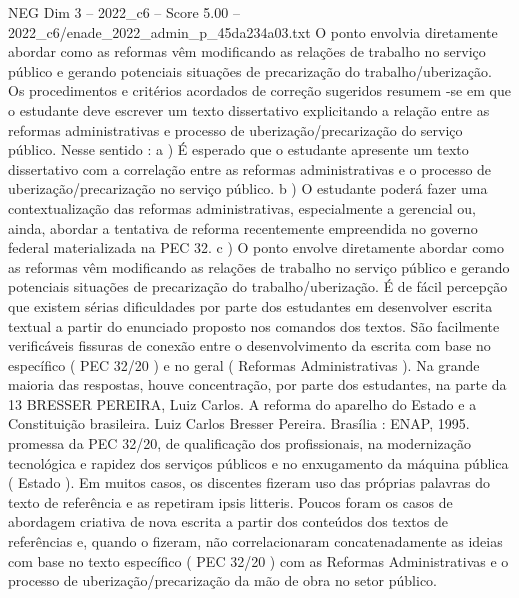 \begin{textsample}{NEG Dim 3 – 2022\_c6 – Score 5.00 – 2022\_c6/enade\_2022\_admin\_p\_45da234a03.txt}
O ponto envolvia diretamente abordar como as reformas vêm modificando as relações de trabalho no serviço público e gerando potenciais situações de precarização do trabalho/uberização.
Os procedimentos e critérios acordados de correção sugeridos resumem -se em que o estudante deve escrever um texto dissertativo explicitando a relação entre as reformas administrativas e processo de uberização/precarização do serviço público.
Nesse sentido : a ) É esperado que o estudante apresente um texto dissertativo com a correlação entre as reformas administrativas e o processo de uberização/precarização no serviço público. b ) O estudante poderá fazer uma contextualização das reformas administrativas, especialmente a gerencial ou, ainda, abordar a tentativa de reforma recentemente empreendida no governo federal materializada na PEC 32. c ) O ponto envolve diretamente abordar como as reformas vêm modificando as relações de trabalho no serviço público e gerando potenciais situações de precarização do trabalho/uberização.
É de fácil percepção que existem sérias dificuldades por parte dos estudantes em desenvolver escrita textual a partir do enunciado proposto nos comandos dos textos.
São facilmente verificáveis fissuras de conexão entre o desenvolvimento da escrita com base no específico ( PEC 32/20 ) e no geral ( Reformas Administrativas ).
Na grande maioria das respostas, houve concentração, por parte dos estudantes, na parte da 13 BRESSER PEREIRA, Luiz Carlos.
A reforma do aparelho do Estado e a Constituição brasileira.
Luiz Carlos Bresser Pereira.
Brasília : ENAP, 1995. promessa da PEC 32/20, de qualificação dos profissionais, na modernização tecnológica e rapidez dos serviços públicos e no enxugamento da máquina pública ( Estado ).
Em muitos casos, os discentes fizeram uso das próprias palavras do texto de referência e as repetiram ipsis litteris.
Poucos foram os casos de abordagem criativa de nova escrita a partir dos conteúdos dos textos de referências e, quando o fizeram, não correlacionaram concatenadamente as ideias com base no texto específico ( PEC 32/20 ) com as Reformas Administrativas e o processo de uberização/precarização da mão de obra no setor público.

\end{textsample}
